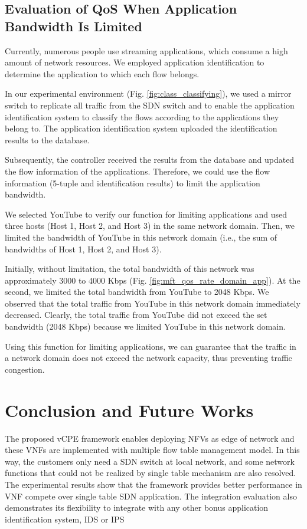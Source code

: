\documentclass[10pt,journal]{IEEEtran}
\begin{document}
\subsection{Evaluation of QoS When Application Bandwidth Is Limited}
Currently, numerous people use streaming applications, which consume a high amount of network resources. We employed application identification to determine the application to which each flow belongs.

In our experimental environment (Fig. \ref{fig:class_classifying}), we used a mirror switch to replicate all traffic from the SDN switch and to enable the application identification system to classify the flows according to the applications they belong to. The application identification system uploaded the identification results to the database.


Subsequently, the controller received the results from the database and updated the flow information of the applications. Therefore, we could use the flow information (5-tuple and identification results) to limit the application bandwidth.

We selected YouTube to verify our function for limiting applications and used three hosts (Host 1, Host 2, and Host 3) in the same network domain. Then, we limited the bandwidth of YouTube in this network domain (i.e., the sum of bandwidths of Host 1, Host 2, and Host 3).

Initially, without limitation, the total bandwidth of this network was approximately 3000 to 4000 Kbps (Fig. \ref{fig:mft_qos_rate_domain_app}). At the  second, we limited the total bandwidth from YouTube to 2048 Kbps. We observed that the total traffic from YouTube in this network domain immediately decreased. Clearly, the total traffic from YouTube did not exceed the set bandwidth (2048 Kbps) because we limited YouTube in this network domain.

Using this function for limiting applications, we can guarantee that the traffic in a network domain does not exceed the network capacity, thus preventing traffic congestion.



\section{Conclusion and Future Works}
The proposed vCPE framework enables deploying NFVs as edge of network and these VNFs are implemented with multiple flow table management model. In this way, the customers only need a SDN switch at local network, and some network functions that could not be realized by single table mechanism are also resolved. The experimental results show that the framework provides better performance in VNF compete over single table SDN application. The integration evaluation also demonstrates its flexibility to integrate with any other bonus application identification system, IDS or IPS
\end{document}
